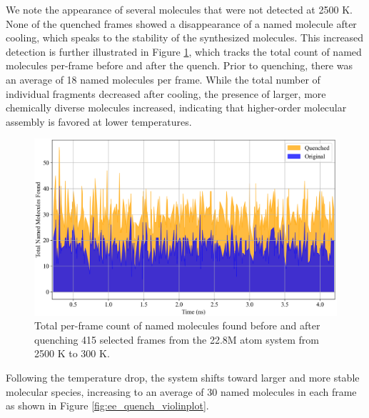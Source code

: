 We note the appearance of several molecules that were not detected at 2500 K.
None of the quenched frames showed a disappearance of a named molecule after cooling, which speaks to the stability of the synthesized molecules.
This increased detection is further illustrated in Figure \ref{fig:ee_quench_lineplot}, which tracks the total count of named molecules per-frame before and after the quench. 
Prior to quenching, there was an average of 18 named molecules per frame.
While the total number of individual fragments decreased after cooling, the presence of larger, more chemically diverse molecules increased, indicating that higher-order molecular assembly is favored at lower temperatures.

\begin{figure}[!h]
    \centering
    \includegraphics[width=0.885\linewidth]{Images/early_earth/named_mols_before-after_quench.png}
    \caption[Line plot: total named molecules found before and after quenching system]{Total per-frame count of named molecules found before and after quenching 415 selected frames from the 22.8M atom system from 2500 K to 300 K.}
    \label{fig:ee_quench_lineplot}
\end{figure}

Following the temperature drop, the system shifts toward larger and more stable molecular species, increasing to an average of 30 named molecules in each frame as shown in Figure \ref{fig:ee_quench_violinplot}.

